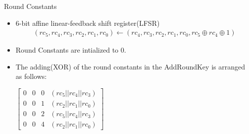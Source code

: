 \begin{frame}{Round Constants}
    \begin{itemize}
        \item 6-bit affine linear-feedback shift register(LFSR)
        \begin{align*}
        (rc_5, rc_4, rc_3, rc_2, rc_1, rc_0) \leftarrow (rc_4, rc_3, rc_2, rc_1, rc_0, rc_5 \oplus rc_4 \oplus 1)
        \end{align*}
        \pause
        \item Round Constants are intialized to 0.
        \pause
        \item The adding(XOR) of the round constants in the AddRoundKey is arranged as follows:\\
        \begin{center}
            $\begin{bmatrix}
        0 & 0 & 0 &(rc_5 || rc_4 || rc_3)\\
        0 & 0 & 1 &(rc_2 || rc_1 || rc_0)\\
        0 & 0 & 2 &(rc_5 || rc_4 || rc_3)\\
        0 & 0 & 4 &(rc_2 || rc_1 || rc_0)
        \end{bmatrix}$
        \end{center}
    \end{itemize}
\end{frame}

